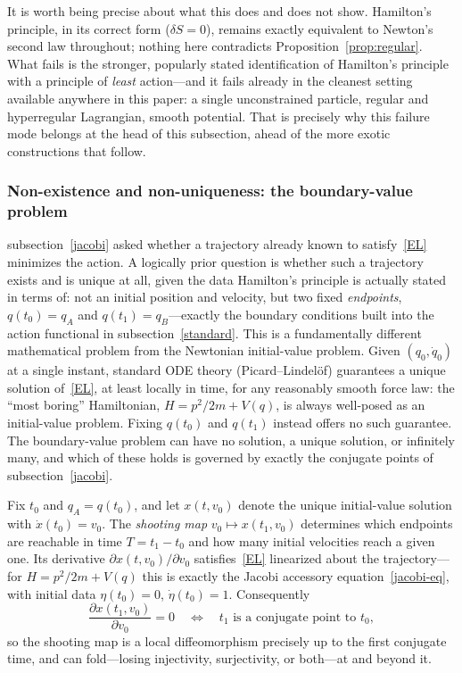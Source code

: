It is worth being precise about what this does and does not show. Hamilton's
principle, in its correct form ($\delta S=0$), remains exactly equivalent to
Newton's second law throughout; nothing here contradicts
Proposition~\ref{prop:regular}. What fails is the stronger, popularly stated
identification of Hamilton's principle with a principle of \emph{least}
action---and it fails already in the cleanest setting available anywhere in
this paper: a single unconstrained particle, regular and hyperregular
Lagrangian, smooth potential. That is precisely why this failure mode belongs
at the head of this subsection, ahead of the more exotic constructions that
follow.

\subsubsection{Non-existence and non-uniqueness: the boundary-value problem}
\label{bvp}

subsection~\ref{jacobi} asked whether a trajectory already known to
satisfy~\eqref{EL} minimizes the action. A logically prior question is whether
such a trajectory exists and is unique at all, given the data Hamilton's
principle is actually stated in terms of: not an initial position and velocity,
but two fixed \emph{endpoints}, $q(t_0)=q_A$ and $q(t_1)=q_B$---exactly the
boundary conditions built into the action functional in
subsection~\ref{standard}. This is a fundamentally different mathematical
problem from the Newtonian initial-value problem. Given $(q_0,\dot q_0)$ at a
single instant, standard ODE theory (Picard--Lindelöf) guarantees a unique
solution of~\eqref{EL}, at least locally in time, for any reasonably smooth
force law: the ``most boring'' Hamiltonian, $H=p^2/2m+V(q)$, is always
well-posed as an initial-value problem. Fixing $q(t_0)$ and $q(t_1)$ instead
offers no such guarantee. The boundary-value problem can have no solution, a
unique solution, or infinitely many, and which of these holds is governed by
exactly the conjugate points of subsection~\ref{jacobi}.

Fix $t_0$ and $q_A=q(t_0)$, and let $x(t,v_0)$ denote the unique initial-value
solution with $\dot x(t_0)=v_0$. The \emph{shooting map} $v_0\mapsto
x(t_1,v_0)$ determines which endpoints are reachable in time $T=t_1-t_0$ and
how many initial velocities reach a given one. Its derivative $\partial
x(t,v_0)/\partial v_0$ satisfies~\eqref{EL} linearized about the
trajectory---for $H=p^2/2m+V(q)$ this is exactly the Jacobi accessory
equation~\eqref{jacobi-eq}, with initial data $\eta(t_0)=0$, $\dot\eta(t_0)=1$.
Consequently
\begin{equation}
\frac{\partial x(t_1,v_0)}{\partial v_0} = 0
    \quad\Longleftrightarrow\quad t_1 \text{ is a conjugate point to } t_0 ,
\end{equation}
so the shooting map is a local diffeomorphism precisely up to the first
conjugate time, and can fold---losing injectivity, surjectivity, or both---at
and beyond it.

